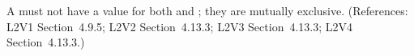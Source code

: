 A \SpeciesReference must not have a value for both 
and ; they are mutually exclusive.  (References:
L2V1 Section~4.9.5; L2V2 Section~4.13.3; L2V3 Section~4.13.3; L2V4 Section~4.13.3.)
